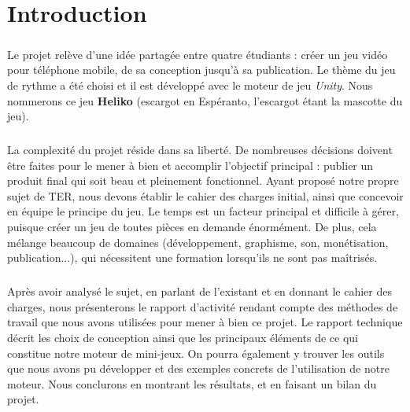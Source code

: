 \chapter{Introduction}

\paragraph{}
Le projet relève d'une idée partagée entre quatre étudiants : créer un jeu vidéo pour téléphone mobile, de sa conception jusqu'à sa publication. Le thème du jeu de rythme a été choisi et il est développé avec le moteur de jeu \textit{Unity}. Nous nommerons ce jeu \textbf{Heliko} (escargot en Espéranto, l'escargot étant la mascotte du jeu).

\paragraph{}
La complexité du projet réside dans sa liberté. De nombreuses décisions doivent être faites pour le mener à bien et accomplir l'objectif principal : publier un produit final qui soit beau et pleinement fonctionnel. Ayant proposé notre propre sujet de TER, nous devons établir le cahier des charges initial, ainsi que concevoir en équipe le principe du jeu. Le temps est un facteur principal et difficile à gérer, puisque créer un jeu de toutes pièces en demande énormément. De plus, cela mélange beaucoup de domaines (développement, graphisme, son, monétisation, publication...), qui nécessitent une formation lorsqu'ils ne sont pas maîtrisés.

\paragraph{}
Après avoir analysé le sujet, en parlant de l'existant et en donnant le cahier des charges, nous présenterons le rapport d'activité rendant compte des méthodes de travail que nous avons utilisées pour mener à bien ce projet. Le rapport technique décrit les choix de conception ainsi que les principaux éléments de ce qui constitue notre moteur de mini-jeux. On pourra également y trouver les outils que nous avons pu développer et des exemples concrets de l'utilisation de notre moteur. Nous conclurons en montrant les résultats, et en faisant un bilan du projet.
